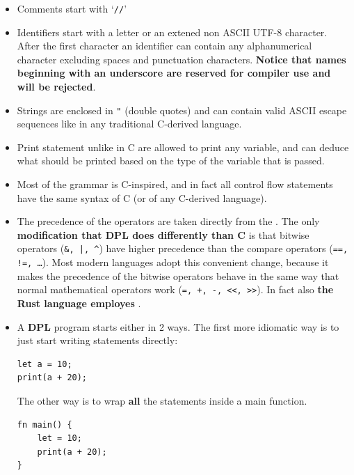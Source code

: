 \documentclass[a4paper]{article}
\newcommand{\urlref}[3][blue]{\href{#2}{\color{#1}{#3}}}%
\begin{document}
\begin{itemize}
    \item Comments start with `\texttt{//}'
    \item Identifiers start with a letter or an extened non ASCII UTF-8 character. After the first
        character an identifier can contain any alphanumerical character excluding spaces and punctuation characters.
        \textbf{Notice that names beginning with an underscore are reserved for compiler use and will be rejected}.
    \item Strings are enclosed in \texttt{"} (double quotes) and can contain valid ASCII escape sequences like
        in any traditional C-derived language.
    \item Print statement unlike in C are allowed to print any variable, and can deduce what should be printed
        based on the type of the variable that is passed.
    \item Most of the grammar is C-inspired, and in fact all control flow statements have
        the same syntax of C (or of any C-derived language).
    \item The precedence of the operators are taken directly from the \urlref{https://en.cppreference.com/w/c/language/operator_precedence}{C precedence table}.
        The only \textbf{modification that DPL does differently than C} is that bitwise operators (\texttt{\&, |, \^})
        have higher precedence than the compare operators (\texttt{==, !=, \dots}). Most modern languages
        adopt this convenient change, because it makes the precedence of the bitwise operators behave in the same
        way that normal mathematical operators work (\texttt{=, +, -, <<, >>}).
        In fact also \textbf{the Rust language employes} \urlref{https://doc.rust-lang.org/1.22.1/reference/expressions/operator-expr.html\#operator-precedence}{this same modification}.
    \item A \textbf{DPL} program starts either in 2 ways. The first more idiomatic way is to just start
        writing statements directly:
        \begin{lstlisting}[language=DPL]
let a = 10;
print(a + 20);
        \end{lstlisting}

        The other way is to wrap \textbf{all} the statements inside a main function.

        \begin{lstlisting}[language=DPL]
fn main() {
    let = 10;
    print(a + 20);
}
        \end{lstlisting}


\end{itemize}
\end{document}
